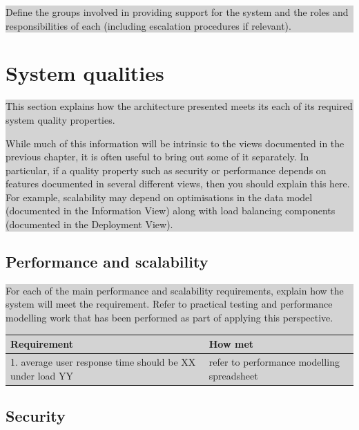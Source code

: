 \documentclass[a4paper,11pt]{report}
\newcommand{\instructions}[1]{
  \noindent\colorbox{lightgray}{%
    \parbox{\linewidth}{%
      #1
    }%
  }%
 \vspace{0.1cm}
}
\begin{document}
\instructions{
Define the groups involved in providing support for the system and the
roles and responsibilities of each (including escalation procedures if
relevant).
}

\chapter{System qualities}
\label{cha:system-qualities}
\thispagestyle{fancy}

\instructions{
This section explains how the architecture presented
  meets its each of its required system quality properties.

While much of this information will be intrinsic to the views
documented in the previous chapter, it is often useful to bring out
some of it separately. In particular, if a quality property such as
security or performance depends on features documented in several
different views, then you should explain this here. For example,
scalability may depend on optimisations in the data model (documented
in the Information View) along with load balancing components
(documented in the Deployment View).
}

\section{Performance and scalability}
\label{sec:perf-scal}

\instructions{
For each of the main performance and scalability requirements, explain
how the system will meet the requirement. Refer to practical testing
and performance modelling work that has been performed as part of
applying this perspective.

\begin{center}
  \begin{tabular}[h!]{| p{0.4\textwidth} | p{0.5\textwidth} |}
    \hline
    \rowcolor{gray}
    Requirement & How met \\
    \hline
    \hline
    1. average user response time should be XX under load YY & refer
    to performance modelling spreadsheet\\

    \hline
 \end{tabular}
\end{center}

}

\section{Security}
\label{sec:security}
\end{document}
